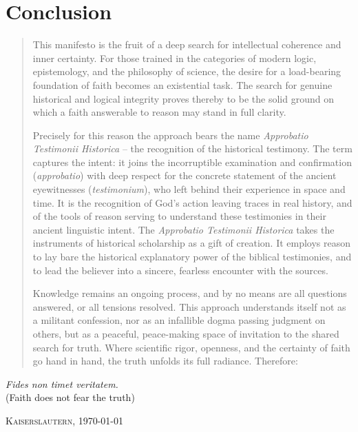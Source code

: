 \documentclass[11pt,a4paper]{article}
\begin{document}
\begin{minipage}{\textwidth}
\section*{Conclusion}
\begin{quote}
This manifesto is the fruit of a deep search for intellectual coherence and inner certainty. For those trained in the categories of modern logic, epistemology, and the philosophy of science, the desire for a load-bearing foundation of faith becomes an existential task. The search for genuine historical and logical integrity proves thereby to be the solid ground on which a faith answerable to reason may stand in full clarity.  

Precisely for this reason the approach bears the name \textit{Approbatio Testimonii Historica} -- the recognition of the historical testimony. The term captures the intent: it joins the incorruptible examination and confirmation (\textit{approbatio}) with deep respect for the concrete statement of the ancient eyewitnesses (\textit{testimonium}), who left behind their experience in space and time. It is the recognition of God's action leaving traces in real history, and of the tools of reason serving to understand these testimonies in their ancient linguistic intent.  The \textit{Approbatio Testimonii Historica} takes the instruments of historical scholarship as a gift of creation. It employs reason to lay bare the historical explanatory power of the biblical testimonies, and to lead the believer into a sincere, fearless encounter with the sources.

Knowledge remains an ongoing process, and by no means are all questions answered, or all tensions resolved. This approach understands itself not as a militant confession, nor as an infallible dogma passing judgment on others, but as a peaceful, peace-making space of invitation to the shared search for truth. Where scientific rigor, openness, and the certainty of faith go hand in hand, the truth unfolds its full radiance. Therefore:
\end{quote}

\begin{center}
{\large\itshape Fides non timet veritatem.}\\[0.3em]
{\small (Faith does not fear the truth)}
\end{center}

\vspace{0.2cm}
\begin{flushright}
{\scshape Kaiserslautern, \today}
\end{flushright}


\end{minipage}
\end{document}

